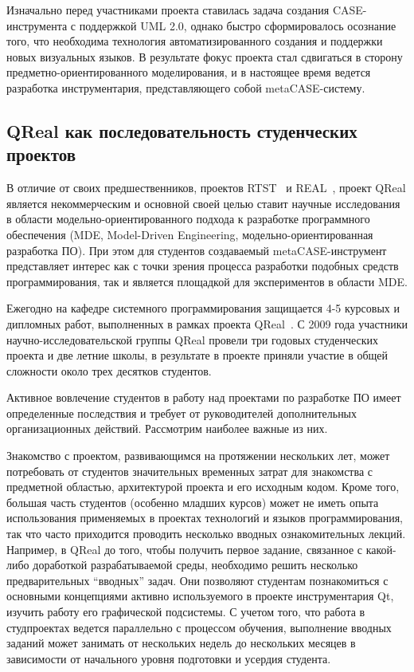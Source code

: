 \documentclass[a4paper]{article}
\begin{document}
Изначально перед участниками проекта ставилась задача создания CASE-инструмента с поддержкой UML 2.0, однако быстро сформировалось осознание того, что необходима технология автоматизированного создания и поддержки новых визуальных языков. В результате фокус проекта стал сдвигаться в сторону предметно-ориентированного моделирования, и в настоящее время ведется разработка инструментария, представляющего собой metaCASE-систему. 

\subsection{QReal как последовательность студенческих проектов}

В отличие от своих предшественников, проектов RTST~\cite{rtst} и REAL~\cite{real}, проект QReal является некоммерческим и основной своей целью ставит научные исследования в области модельно-ориентированного подхода к разработке программного обеспечения (MDE, Model-Driven Engineering, модельно-ориентированная разработка ПО). При этом для студентов создаваемый metaCASE-инструмент  представляет интерес как с точки зрения процесса разработки подобных средств программирования, так и является площадкой для экспериментов в области MDE. 

Ежегодно на кафедре системного программирования защищается 4-5 курсовых и дипломных работ, выполненных в рамках проекта QReal~\cite{termPapers}. С 2009 года участники научно-исследовательской группы QReal провели три годовых студенческих проекта и две летние школы, в результате в проекте приняли участие в общей сложности около трех десятков студентов.

Активное вовлечение студентов в работу над проектами по разработке ПО имеет определенные последствия и требует от руководителей дополнительных организационных действий. Рассмотрим наиболее важные из них.

Знакомство с проектом, развивающимся на протяжении нескольких лет, может потребовать от студентов значительных временных затрат для знакомства с предметной областью, архитектурой проекта и его исходным кодом. Кроме того, большая часть студентов (особенно младших курсов) может не иметь опыта использования применяемых в проектах технологий и языков программирования, так что часто приходится проводить несколько вводных ознакомительных лекций. Например, в QReal до того, чтобы получить первое задание, связанное с какой-либо доработкой разрабатываемой среды, необходимо решить несколько предварительных ``вводных'' задач. Они позволяют студентам познакомиться с основными концепциями активно используемого в проекте инструментария Qt, изучить работу его графической подсистемы. С учетом того, что работа в студпроектах ведется параллельно с процессом обучения, выполнение вводных заданий может занимать от нескольких недель до нескольких месяцев в зависимости от начального уровня подготовки и усердия студента.
\end{document}
